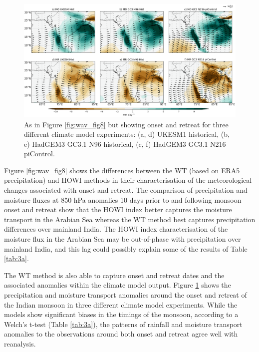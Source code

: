 \begin{figure}[t!]
\centering
 \includegraphics[width=\linewidth]{figures/ind_models.png}
\caption[Indian monsoon precipitation anomalies associated with onset]{ As in Figure \ref{fig:wav_fig8} but showing onset and retreat for three different climate model experiments: (a, d) UKESM1 historical, (b, e) HadGEM3 GC3.1 N96 historical, (c, f) HadGEM3 GC3.1 N216 piControl.   }
\label{fig:indmodels}
\end{figure}

Figure \ref{fig:wav_fig8} shows the differences between the WT (based on ERA5 precipitation) and HOWI methods in their characterisation of the meteorological changes associated with onset and retreat. 
The comparison of precipitation and moisture fluxes at 850 hPa anomalies 10 days prior to and following monsoon onset and retreat show that the HOWI index better captures the moisture transport in the Arabian Sea whereas the WT method best captures precipitation differences over mainland India. The HOWI index characterisation of the moisture flux in the Arabian Sea may be out-of-phase with precipitation over mainland India, and this lag could possibly explain some of the results of Table \ref{tab:3a}.


 The WT method is also able to capture onset and retreat dates and the associated anomalies within the climate model output. Figure \ref{fig:indmodels} shows the precipitation and moisture transport anomalies around the onset and retreat of the Indian monsoon in three different climate model experiments. While the models show significant biases in the timings of the monsoon, according to a Welch's t-test (Table \ref{tab:3a}), the patterns of rainfall and moisture transport anomalies to the observations around both onset and retreat agree well with reanalysis. 

